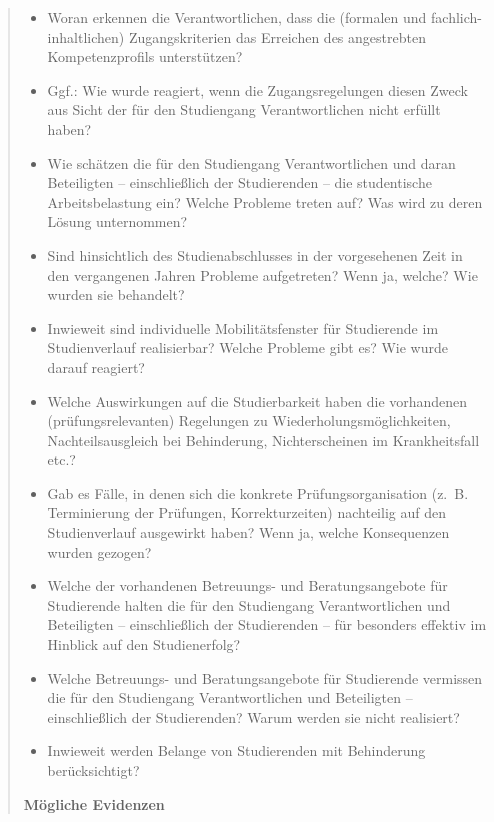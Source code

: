 \begin{quote}
\begin{itemize}
\item
  Woran erkennen die Verantwortlichen, dass die (formalen und
  fachlich-inhaltlichen) Zugangskriterien das Erreichen des angestrebten
  Kompetenzprofils unterstützen?
\item
  Ggf.: Wie wurde reagiert, wenn die Zugangsregelungen diesen Zweck aus
  Sicht der für den Studiengang Verantwortlichen nicht erfüllt haben?
\item
  Wie schätzen die für den Studiengang Verantwortlichen und daran
  Beteiligten -- einschließlich der Studierenden -- die studentische
  Arbeitsbelastung ein? Welche Probleme treten auf? Was wird zu deren
  Lösung unternommen?
\item
  Sind hinsichtlich des Studienabschlusses in der vorgesehenen Zeit in
  den vergangenen Jahren Probleme aufgetreten? Wenn ja, welche? Wie
  wurden sie behandelt?
\item
  Inwieweit sind individuelle Mobilitätsfenster für Studierende im
  Studienverlauf realisierbar? Welche Probleme gibt es? Wie wurde darauf
  reagiert?
\item
  Welche Auswirkungen auf die Studierbarkeit haben die vorhandenen
  (prüfungsrelevanten) Regelungen zu Wiederholungsmöglichkeiten,
  Nachteilsausgleich bei Behinderung, Nichterscheinen im Krankheitsfall
  etc.?
\item
  Gab es Fälle, in denen sich die konkrete Prüfungsorganisation (z.~B.
  Terminierung der Prüfungen, Korrekturzeiten) nachteilig auf den
  Studienverlauf ausgewirkt haben? Wenn ja, welche Konsequenzen wurden
  gezogen?
\item
  Welche der vorhandenen Betreuungs- und Beratungsangebote für
  Studierende halten die für den Studiengang Verantwortlichen und
  Beteiligten -- einschließlich der Studierenden -- für besonders
  effektiv im Hinblick auf den Studienerfolg?
\item
  Welche Betreuungs- und Beratungsangebote für Studierende vermissen die
  für den Studiengang Verantwortlichen und Beteiligten -- einschließlich
  der Studierenden? Warum werden sie nicht realisiert?
\item
  Inwieweit werden Belange von Studierenden mit Behinderung
  berücksichtigt?
\end{itemize}

\textbf{Mögliche Evidenzen}


\end{quote}

